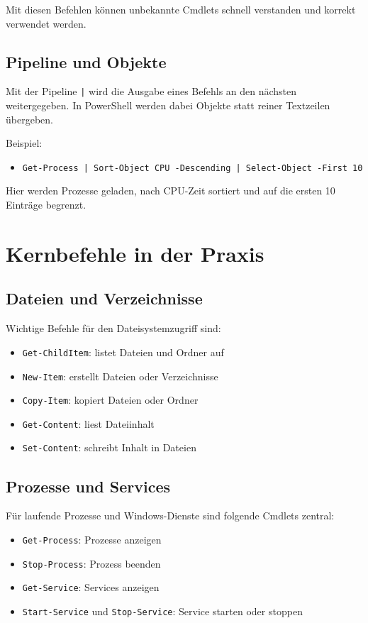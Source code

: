 \documentclass[11pt, oneside, numbers=noenddot]{scrbook}
\begin{document}
Mit diesen Befehlen können unbekannte Cmdlets schnell verstanden und korrekt verwendet werden.

\section{Pipeline und Objekte}
Mit der Pipeline \texttt{|} wird die Ausgabe eines Befehls an den nächsten weitergegeben. In PowerShell werden dabei Objekte statt reiner Textzeilen übergeben.

Beispiel:
\begin{itemize}
\item \texttt{Get-Process | Sort-Object CPU -Descending | Select-Object -First 10}
\end{itemize}

Hier werden Prozesse geladen, nach CPU-Zeit sortiert und auf die ersten 10 Einträge begrenzt.

\chapter{Kernbefehle in der Praxis}

\section{Dateien und Verzeichnisse}
Wichtige Befehle für den Dateisystemzugriff sind:
\begin{itemize}
\item \texttt{Get-ChildItem}: listet Dateien und Ordner auf
\item \texttt{New-Item}: erstellt Dateien oder Verzeichnisse
\item \texttt{Copy-Item}: kopiert Dateien oder Ordner
\item \texttt{Get-Content}: liest Dateiinhalt
\item \texttt{Set-Content}: schreibt Inhalt in Dateien
\end{itemize}

\section{Prozesse und Services}
Für laufende Prozesse und Windows-Dienste sind folgende Cmdlets zentral:
\begin{itemize}
\item \texttt{Get-Process}: Prozesse anzeigen
\item \texttt{Stop-Process}: Prozess beenden
\item \texttt{Get-Service}: Services anzeigen
\item \texttt{Start-Service} und \texttt{Stop-Service}: Service starten oder stoppen
\end{itemize}
\end{document}
